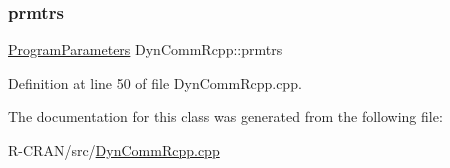 \mbox{\label{classDynCommRcpp_a686a84dced9c0cd812cb184d48958758}} 
\subsubsection{\texorpdfstring{prmtrs}{prmtrs}}
{\footnotesize\ttfamily \hyperlink{structProgramParameters}{Program\+Parameters} Dyn\+Comm\+Rcpp\+::prmtrs\hspace{0.3cm}{\ttfamily [private]}}



Definition at line 50 of file Dyn\+Comm\+Rcpp.\+cpp.



The documentation for this class was generated from the following file\+:\begin{DoxyCompactItemize}
\item 
R-\/\+C\+R\+A\+N/src/\hyperlink{DynCommRcpp_8cpp}{Dyn\+Comm\+Rcpp.\+cpp}\end{DoxyCompactItemize}
